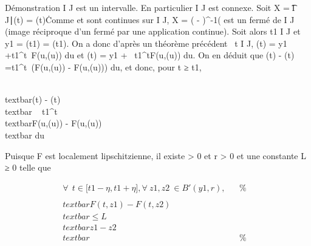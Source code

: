 Démonstration I \bigcap J est un intervalle. En particulier I \bigcap J est connexe.
Soit X = \t \in I \bigcap J∣\phi(t) =
\psi(t)\. Comme \phi et \psi sont continues sur I \bigcap J, X = (\phi
- \psi)^-1(\0\) est un fermé de
I \bigcap J (image réciproque d'un fermé par une application continue). Soit
alors t1 \in I \bigcap J et y1 = \phi(t1) =
\psi(t1). On a donc d'après un théorème précédent
\forall~t \in I \bigcap J, \phi(t) = y1~
+\int  t1^t~F(u,\phi(u))
du et \psi(t) = y1 +\int ~
t1^tF(u,\psi(u)) du. On en déduit que \phi(t) - \psi(t)
=\int  t1^t~(F(u,\phi(u))
- F(u,\psi(u))) du, et donc, pour t ≥ t1,

\\textbar{}\phi(t) - \psi(t)\\textbar{}
\leq\int ~
t1^t\\textbar{}F(u,\phi(u)) -
F(u,\psi(u))\\textbar{} du

Puisque F est localement lipschitzienne, il existe \eta \textgreater{} 0 et
r \textgreater{} 0 et une constante L ≥ 0 telle que

\begin{align*} \forall~~t \in
{[}t1 - \eta,t1 + \eta{]},
\forall~z1,z2~ \in
B'(y1,r),& & \%& \\
\\textbar{}F(t,z1) -
F(t,z2)\\textbar{} \leq
L\\textbar{}z1 -
z2\\textbar{}& & \%&
\\ \end{align*}

